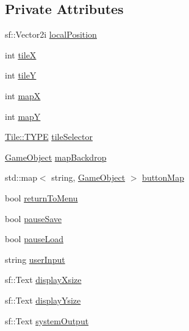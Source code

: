 \subsection*{Private Attributes}
\begin{DoxyCompactItemize}
\item 
sf\+::\+Vector2i \hyperlink{class_game_state_map_editor_ae08d2b6a646ef5a012e037e34a6ec614}{local\+Position}
\item 
int \hyperlink{class_game_state_map_editor_ac02a7afdf3ca713627322460561a6c17}{tile\+X}
\item 
int \hyperlink{class_game_state_map_editor_a9b45f464739e1bab13b680165ff4058c}{tile\+Y}
\item 
int \hyperlink{class_game_state_map_editor_a0faeb397ec456d4caf9f01f7a185ab38}{map\+X}
\item 
int \hyperlink{class_game_state_map_editor_a41805472ec52466a2ae2eedf5fc1c960}{map\+Y}
\item 
\hyperlink{class_tile_acb53d82f9dacff45a98acc63276928eb}{Tile\+::\+T\+Y\+P\+E} \hyperlink{class_game_state_map_editor_a391093f0b5f275c408efe6e9646bedd0}{tile\+Selector}
\item 
\hyperlink{class_game_object}{Game\+Object} \hyperlink{class_game_state_map_editor_aad804976be5b8bb4a1aa0a8e5f63863c}{map\+Backdrop}
\item 
std\+::map$<$ string, \hyperlink{class_game_object}{Game\+Object} $>$ \hyperlink{class_game_state_map_editor_adda219b4fc3202046be4e861db0971c8}{button\+Map}
\item 
bool \hyperlink{class_game_state_map_editor_a3a2c317aa0be29c33e95c37455048cbd}{return\+To\+Menu}
\item 
bool \hyperlink{class_game_state_map_editor_a084696f8b56a5e785e6c44dfb7a78f72}{pause\+Save}
\item 
bool \hyperlink{class_game_state_map_editor_aaef9765b9f8d61e596d5e43eaca37802}{pause\+Load}
\item 
string \hyperlink{class_game_state_map_editor_aa3fc0514a4faa043d6789fd830d2c5ef}{user\+Input}
\item 
sf\+::\+Text \hyperlink{class_game_state_map_editor_a4c832c3e0e1ce9de41e7393d57ac736a}{display\+Xsize}
\item 
sf\+::\+Text \hyperlink{class_game_state_map_editor_af1cea885d9fb3c8023b5c7bb9d7e6ee0}{display\+Ysize}
\item 
sf\+::\+Text \hyperlink{class_game_state_map_editor_ae9103d07effafe086fb2a808be7fac81}{system\+Output}
\item 

\end{DoxyCompactItemize}
